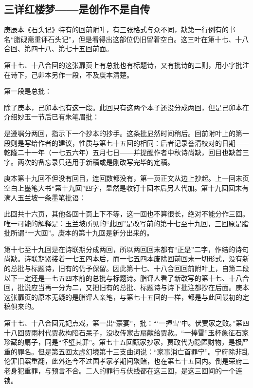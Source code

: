 \subsection{三详红楼梦——是创作不是自传}


\par 庚辰本《石头记》特有的回前附叶，有三张格式与众不同，缺第一行例有的书名“脂砚斋重评石头记”，但是看得出这部位仍旧留着空白。这三叶在第十七、十八合回、第四十八、第七十五回前面。
\par 第十七、十八合回的这张扉页上有总批也有标题诗，又有批诗的二则，用小字批注在诗下，己卯本另作一段，不及庚本清楚。
\par 第一段是总批：
\par 除了庚本，己卯本也有这一段。此回只有这两个本子还没分成两回，但是己卯本在介绍妙玉一节后已有朱笔眉批：
\par 是遵嘱分两回，指示下一个抄本的抄手。这条批显然时间稍后。回前附叶上的第一段则是写给作者的建议，性质与第七十五回的相同：后者记录誊清校对的日期——乾隆二十一年（一七五六年）五月七日——并提醒作者中秋诗尚缺，回目也缺首三字。两次的备忘录只适用于新稿或是刚改写完毕的定稿。
\par 庚本第十九回不但没有回目，连回数都没有，第一页正文从边上抄起。上一回末页空白上墨笔大书“第十九回”四字，显然是收钉十回本后另人代加。第十九回回末有满人玉兰坡一条墨笔批语：
\par 此回共十六页，其他各回十页上下不等，这一回也不算很长，绝对不能分作三回。唯一可能的解释是：玉兰坡所见的“此回”是改写前的第十七至十九回，三回原是脂批所谓“一大回”。庚本的第十九回是新分出来的。
\par 第十七至十九回是在诗联期分成两回，所以两回回末都有“正是”二字，作结的诗句尚缺。诗联期紧接着一七五四本后，而一七五四本废除回前回末一切形式，没有新的总批与标题诗，旧有的仍予保留。因此第十七、十八合回回前附叶上，自第二段以下一定还是一七五四本前的总批与标题诗。脂评人看了新改写的第十七、十八合回，批说应当再一分为二，又把旧有的总批、标题诗与诗下批注都抄在后面。庚本这张扉页的原本无疑的是脂评人亲笔，与第七十五回的一样，都是与此回最初的定稿俱来的。
\par 第十七、十八合回元妃点戏，第一出“豪宴”，批：“‘一捧雪’中。伏贾家之败。”第四十八回贾雨村代贾赦构陷石呆子，没收传家古扇献给贾赦。“一捧雪”玉杯象征石家珍藏的扇子，同是“怀璧其罪”。第七十五回甄家抄家，贾政代为隐匿财物，是极严重的罪名。但是第五回太虚幻境第十三支曲词说：“家事消亡首罪宁”。宁府除非乱伦罪旧案重翻，此外迄今不过国孝家孝期间聚赌，也在第七十五回内。倒是荣府二老身犯重罪，与预言不合。二人的罪行与伏线都在这三回，是这三回间的一个连锁。
